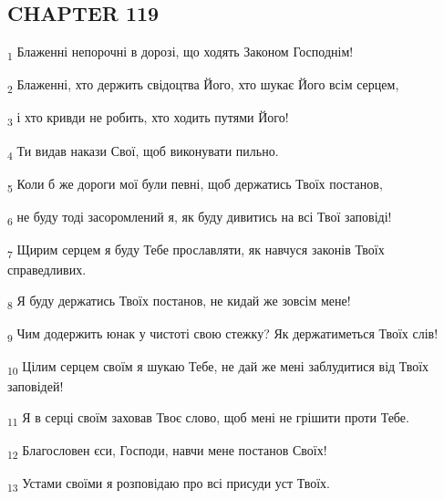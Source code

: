 \subsection{CHAPTER 119}
\begin{tcolorbox}
\textsubscript{1} Блаженні непорочні в дорозі, що ходять Законом Господнім!
\end{tcolorbox}
\begin{tcolorbox}
\textsubscript{2} Блаженні, хто держить свідоцтва Його, хто шукає Його всім серцем,
\end{tcolorbox}
\begin{tcolorbox}
\textsubscript{3} і хто кривди не робить, хто ходить путями Його!
\end{tcolorbox}
\begin{tcolorbox}
\textsubscript{4} Ти видав накази Свої, щоб виконувати пильно.
\end{tcolorbox}
\begin{tcolorbox}
\textsubscript{5} Коли б же дороги мої були певні, щоб держатись Твоїх постанов,
\end{tcolorbox}
\begin{tcolorbox}
\textsubscript{6} не буду тоді засоромлений я, як буду дивитись на всі Твої заповіді!
\end{tcolorbox}
\begin{tcolorbox}
\textsubscript{7} Щирим серцем я буду Тебе прославляти, як навчуся законів Твоїх справедливих.
\end{tcolorbox}
\begin{tcolorbox}
\textsubscript{8} Я буду держатись Твоїх постанов, не кидай же зовсім мене!
\end{tcolorbox}
\begin{tcolorbox}
\textsubscript{9} Чим додержить юнак у чистоті свою стежку? Як держатиметься Твоїх слів!
\end{tcolorbox}
\begin{tcolorbox}
\textsubscript{10} Цілим серцем своїм я шукаю Тебе, не дай же мені заблудитися від Твоїх заповідей!
\end{tcolorbox}
\begin{tcolorbox}
\textsubscript{11} Я в серці своїм заховав Твоє слово, щоб мені не грішити проти Тебе.
\end{tcolorbox}
\begin{tcolorbox}
\textsubscript{12} Благословен єси, Господи, навчи мене постанов Своїх!
\end{tcolorbox}
\begin{tcolorbox}
\textsubscript{13} Устами своїми я розповідаю про всі присуди уст Твоїх.
\end{tcolorbox}
